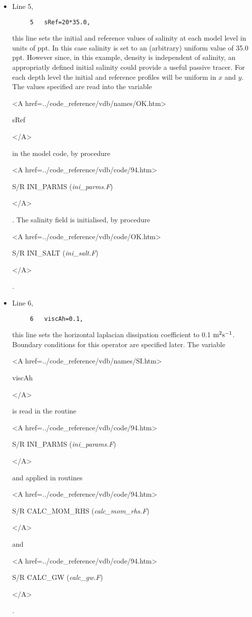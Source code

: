 \begin{itemize}
\item Line 5,
\begin{verbatim}
     5   sRef=20*35.0,
\end{verbatim}
this line sets the initial and reference values of salinity at each model
level in units of ppt. In this case salinity is set to an (arbitrary) uniform value of 
35.0 ppt. However since, in this example, density is independent of salinity, 
an appropriatly defined initial salinity could provide a useful passive 
tracer. For each depth level the initial and reference profiles will be uniform in
$x$ and $y$. The values specified are read into the
variable 
{\bf
\begin{rawhtml} <A href=../code_reference/vdb/names/OK.htm> \end{rawhtml}
sRef
\begin{rawhtml} </A>\end{rawhtml}
} 
in the model code, by procedure 
{\it
\begin{rawhtml} <A href=../code_reference/vdb/code/94.htm> \end{rawhtml}
S/R INI\_PARMS ({\it ini\_parms.F})
}
\begin{rawhtml} </A>\end{rawhtml}.
The salinity field is initialised, by procedure 
{\it
\begin{rawhtml} <A href=../code_reference/vdb/code/OK.htm> \end{rawhtml}
S/R INI\_SALT ({\it ini\_salt.F})
\begin{rawhtml} </A>\end{rawhtml}.
}


\item Line 6,
\begin{verbatim}
     6   viscAh=0.1,
\end{verbatim}
this line sets the horizontal laplacian dissipation coefficient to
0.1 ${\rm m^{2}s^{-1}}$. Boundary conditions
for this operator are specified later. 
The variable 
{\bf 
\begin{rawhtml} <A href=../code_reference/vdb/names/SI.htm> \end{rawhtml}
viscAh
\begin{rawhtml} </A>\end{rawhtml}
}
is read in the routine
{\it
\begin{rawhtml} <A href=../code_reference/vdb/code/94.htm> \end{rawhtml}
S/R INI\_PARMS ({\it ini\_params.F})
\begin{rawhtml} </A>\end{rawhtml}
} and applied in routines 
{\it 
\begin{rawhtml} <A href=../code_reference/vdb/code/94.htm> \end{rawhtml}
S/R CALC\_MOM\_RHS ({\it calc\_mom\_rhs.F})
\begin{rawhtml} </A>\end{rawhtml}
} and 
{\it 
\begin{rawhtml} <A href=../code_reference/vdb/code/94.htm> \end{rawhtml}
S/R CALC\_GW ({\it calc\_gw.F})
\begin{rawhtml} </A>\end{rawhtml}
}.



\end{itemize}
